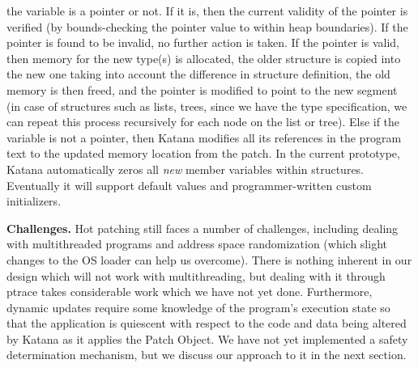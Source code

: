 the variable is a pointer or not. If it is, then the current validity of the
pointer is verified (by bounds-checking the pointer value to within
heap boundaries).  If the pointer is found to be invalid, no further
action is taken.  If the pointer is valid, then memory for the new
type(s) is allocated, the older structure is copied into the new one
taking into account the difference in structure definition, the old
memory is then freed, and the pointer is modified to point to the new
segment (in case of structures such as lists, trees, since we have the
type specification, we can repeat this process recursively for each
node on the list or tree). Else if the variable is not a pointer, then
Katana modifies all its references in the program text to the updated
memory location from the patch. In the current prototype, Katana
automatically zeros all {\it new} member variables within structures.
Eventually it will support default values and programmer-written
custom initializers.

{\bf Challenges.} %
Hot patching still faces a number of
challenges, including dealing with multithreaded programs and address
space randomization (which slight changes to the OS loader can help us
overcome).  
There is nothing inherent in our design which will not work with
multithreading, but dealing with it through ptrace takes considerable
work which we have not yet done.
Furthermore, dynamic updates require some knowledge of the
program's execution state so that the application is quiescent with
respect to the code and data being altered by Katana as it applies the
Patch Object. 
%
We have not
yet implemented a safety determination mechanism, but we discuss our
approach to it in the next section.

